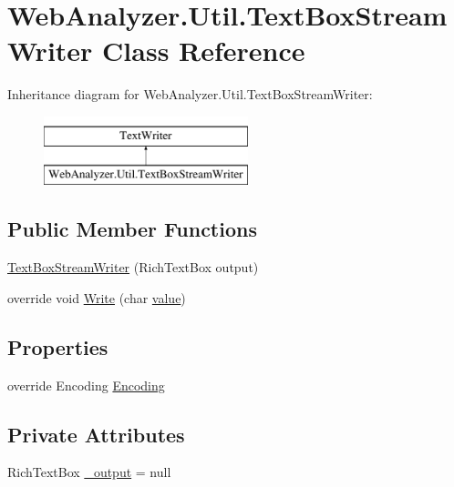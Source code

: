 \hypertarget{class_web_analyzer_1_1_util_1_1_text_box_stream_writer}{}\section{Web\+Analyzer.\+Util.\+Text\+Box\+Stream\+Writer Class Reference}
\label{class_web_analyzer_1_1_util_1_1_text_box_stream_writer}
Inheritance diagram for Web\+Analyzer.\+Util.\+Text\+Box\+Stream\+Writer\+:\begin{figure}[H]
\begin{center}
\leavevmode
\includegraphics[height=2.000000cm]{class_web_analyzer_1_1_util_1_1_text_box_stream_writer}
\end{center}
\end{figure}
\subsection*{Public Member Functions}
\begin{DoxyCompactItemize}
\item 
\hyperlink{class_web_analyzer_1_1_util_1_1_text_box_stream_writer_a29f45f5d09df83e12f0f5f008493d1f3}{Text\+Box\+Stream\+Writer} (Rich\+Text\+Box output)
\item 
override void \hyperlink{class_web_analyzer_1_1_util_1_1_text_box_stream_writer_adae06d7e8f4f1e914b643ab7ae9ca019}{Write} (char \hyperlink{_u_i_2_h_t_m_l_resources_2js_2lib_2underscore_8min_8js_af7e1471ab89699458c4df8bb657298f6}{value})
\end{DoxyCompactItemize}
\subsection*{Properties}
\begin{DoxyCompactItemize}
\item 
override Encoding \hyperlink{class_web_analyzer_1_1_util_1_1_text_box_stream_writer_ac030314a6b1db8711944c33c49c05f6b}{Encoding}
\end{DoxyCompactItemize}
\subsection*{Private Attributes}
\begin{DoxyCompactItemize}
\item 
Rich\+Text\+Box \hyperlink{class_web_analyzer_1_1_util_1_1_text_box_stream_writer_adacb29454407dc6e1513ce1eb172e6f8}{\+\_\+output} = null
\end{DoxyCompactItemize}


